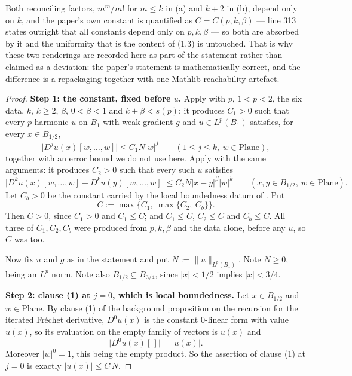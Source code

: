 \begin{theorem}
Both reconciling factors, $m^{m}/m!$ for $m\le k$ in (a) and $k+2$ in (b), depend only on $k$,
and the paper's own constant is quantified as $C=C(p,k,\beta)$ --- line 313 states outright that
all constants depend only on $p,k,\beta$ --- so both are absorbed by it and the uniformity that
is the content of (1.3) is untouched.  That is why these two renderings are recorded here as
part of the statement rather than claimed as a deviation: the paper's statement is
mathematically correct, and the difference is a repackaging together with one
Mathlib-reachability artefact.
\end{theorem}
\begin{proof}
\medskip\noindent\textbf{Step 1: the constant, fixed before $u$.}
Apply  with $p$, $1<p<2$, the six data, $k$, $k\ge2$, $\beta$, $0<\beta<1$
and $k+\beta<s(p)$: it produces $C_1>0$ such that every $p$-harmonic $u$ on $B_1$ with weak
gradient $g$ and $u\in L^{p}(B_1)$ satisfies, for every $x\in B_{1/2}$,
\begin{equation}\label{eq:main-jb}
  \bigl\lvert D^{j}u(x)[w,\ldots,w]\bigr\rvert\le C_1N\lvert w\rvert^{j}
  \qquad(1\le j\le k,\ w\in\mathrm{Plane}),
\end{equation}
together with an error bound we do not use here.  Apply  with the same
arguments: it produces $C_2>0$ such that every such $u$ satisfies
\begin{equation}\label{eq:main-hfj}
  \bigl\lvert D^{k}u(x)[w,\ldots,w]-D^{k}u(y)[w,\ldots,w]\bigr\rvert
  \le C_2N\lvert x-y\rvert^{\beta}\lvert w\rvert^{k}
  \qquad(x,y\in B_{1/2},\ w\in\mathrm{Plane}).
\end{equation}
Let $C_b>0$ be the constant carried by the local boundedness datum of
.  Put
\[
  C:=\max\bigl\{C_1,\ \max\{C_2,\ C_b\}\bigr\}.
\]
Then $C>0$, since $C_1>0$ and $C_1\le C$; and $C_1\le C$, $C_2\le C$ and $C_b\le C$.  All three
of $C_1,C_2,C_b$ were produced from $p,k,\beta$ and the data alone, before any $u$, so $C$ was
too.

Now fix $u$ and $g$ as in the statement and put $N:=\lVert u\rVert_{L^{p}(B_1)}$.  Note
$N\ge0$, being an $L^{p}$ norm.  Note also $B_{1/2}\subseteq B_{3/4}$, since
$\lvert x\rvert<1/2$ implies $\lvert x\rvert<3/4$.

\medskip\noindent\textbf{Step 2: clause (1) at $j=0$, which is local boundedness.}
Let $x\in B_{1/2}$ and $w\in\mathrm{Plane}$.  By clause (1) of the background proposition on
the recursion for the iterated Fr\'echet derivative, $D^{0}u(x)$ is the constant $0$-linear
form with value $u(x)$, so its evaluation on the empty family of vectors is $u(x)$ and
\[
  \bigl\lvert D^{0}u(x)[\,]\bigr\rvert=\lvert u(x)\rvert .
\]
Moreover $\lvert w\rvert^{0}=1$, this being the empty product.  So the assertion of clause (1)
at $j=0$ is exactly $\lvert u(x)\rvert\le C\,N$.


\end{proof}
